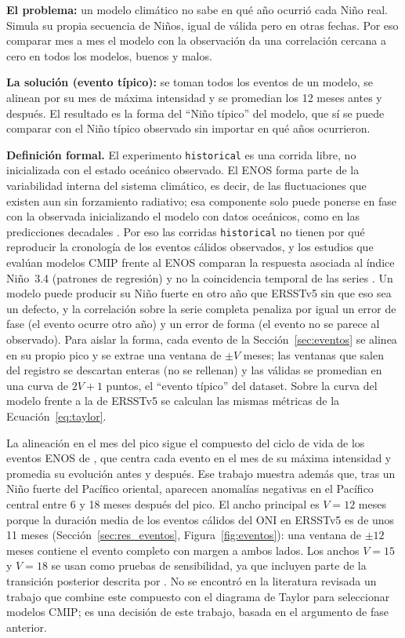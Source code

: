 \documentclass[11pt,a4paper]{article}
\begin{document}
\begin{basico}
\textbf{El problema:} un modelo climático no sabe en qué año ocurrió cada Niño real. Simula su propia secuencia de Niños, igual de válida pero en otras fechas. Por eso comparar mes a mes el modelo con la observación da una correlación cercana a cero en todos los modelos, buenos y malos.

\textbf{La solución (evento típico):} se toman todos los eventos de un modelo, se alinean por su mes de máxima intensidad y se promedian los 12 meses antes y después. El resultado es la forma del ``Niño típico'' del modelo, que sí se puede comparar con el Niño típico observado sin importar en qué años ocurrieron.
\end{basico}

\noindent\textbf{Definición formal.} El experimento \texttt{historical} es una corrida libre, no inicializada con el estado oceánico observado. El ENOS forma parte de la variabilidad interna del sistema climático, es decir, de las fluctuaciones que existen aun sin forzamiento radiativo; esa componente solo puede ponerse en fase con la observada inicializando el modelo con datos oceánicos, como en las predicciones decadales \citep{hawkins2009}. Por eso las corridas \texttt{historical} no tienen por qué reproducir la cronología de los eventos cálidos observados, y los estudios que evalúan modelos CMIP frente al ENOS comparan la respuesta asociada al índice Niño~3.4 (patrones de regresión) y no la coincidencia temporal de las series \citep{kaur2021,sardana2024}. Un modelo puede producir su Niño fuerte en otro año que ERSSTv5 sin que eso sea un defecto, y la correlación sobre la serie completa penaliza por igual un error de fase (el evento ocurre otro año) y un error de forma (el evento no se parece al observado). Para aislar la forma, cada evento de la Sección~\ref{sec:eventos} se alinea en su propio pico y se extrae una ventana de $\pm V$ meses; las ventanas que salen del registro se descartan enteras (no se rellenan) y las válidas se promedian en una curva de $2V+1$ puntos, el ``evento típico'' del dataset. Sobre la curva del modelo frente a la de ERSSTv5 se calculan las mismas métricas de la Ecuación~\eqref{eq:taylor}.

La alineación en el mes del pico sigue el compuesto del ciclo de vida de los eventos ENOS de \citet{yu2011}, que centra cada evento en el mes de su máxima intensidad y promedia su evolución antes y después. Ese trabajo muestra además que, tras un Niño fuerte del Pacífico oriental, aparecen anomalías negativas en el Pacífico central entre 6 y 18 meses después del pico. El ancho principal es $V=12$ meses porque la duración media de los eventos cálidos del ONI en ERSSTv5 es de unos 11 meses (Sección~\ref{sec:res_eventos}, Figura~\ref{fig:eventos}): una ventana de $\pm12$ meses contiene el evento completo con margen a ambos lados. Los anchos $V=15$ y $V=18$ se usan como pruebas de sensibilidad, ya que incluyen parte de la transición posterior descrita por \citet{yu2011}. No se encontró en la literatura revisada un trabajo que combine este compuesto con el diagrama de Taylor para seleccionar modelos CMIP; es una decisión de este trabajo, basada en el argumento de fase anterior.
\end{document}
